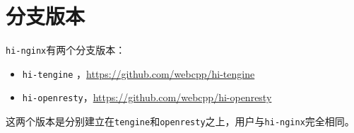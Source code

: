 \section{分支版本}
\texttt{hi-nginx}有两个分支版本：
\begin{itemize}
\item \texttt{hi-tengine} ，\url{https://github.com/webcpp/hi-tengine}
\item \texttt{hi-openresty}，\url{https://github.com/webcpp/hi-openresty}
\end{itemize}
这两个版本是分别建立在\texttt{tengine}和\texttt{openresty}之上，用户与\texttt{hi-nginx}完全相同。
